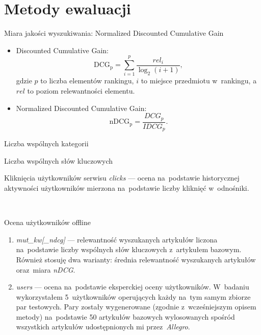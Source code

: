 \documentclass{beamer}
\begin{document}
	\section{Metody ewaluacji}
	\begin{frame}{Miara jakości wyszukiwania: Normalized Discounted Cumulative Gain}
		\begin{itemize}
			\item Discounted Cumulative Gain:
			\begin{equation}
			\label{eq:dcg}
			{\mathrm  {DCG_{{p}}}}=\sum _{{i=1}}^{{p}}{\frac  {rel_{i}}{\log _{{2}}(i+1)}},
			\end{equation}
			gdzie $p$ to liczba elementów rankingu, $i$ to miejsce przedmiotu w~rankingu, a $rel$ to poziom relewantności elementu.
			
			\pause
			\item Normalized Discounted Cumulative Gain:
			\begin{equation}
			\label{eq:ndcg}
			{\mathrm  {nDCG_{{p}}}}={\frac  {DCG_{{p}}}{IDCG_{{p}}}}.
			\end{equation}
		\end{itemize}
	\end{frame}
	\begin{frame}{Liczba wspólnych kategorii}
	\end{frame}
	\begin{frame}{Liczba wspólnych słów kluczowych}
	\end{frame}
	\begin{frame}{Kliknięcia użytkowników serwisu}
		\textit{clicks} --- ocena na~podstawie historycznej aktywności użytkowników mierzona na~podstawie liczby kliknięć w~odnośniki.
	\end{frame}
	\
	\begin{frame}{Ocena użytkowników offline}
		\begin{enumerate}
			\item \textit{mut\_kw[\_ndcg]} --- relewantność wyszukanych artykułów liczona na~podstawie liczby wspólnych słów kluczowych z~artykułem bazowym. Również stosuję dwa warianty: średnia relewantność wyszukanych artykułów oraz~miara \textit{nDCG}.
			\item \textit{users} --- ocena na~podstawie eksperckiej oceny użytkowników. W~badaniu wykorzystałem 5~użytkowników operujących każdy na~tym samym zbiorze par testowych. Pary zostały wygenerowane (zgodnie z~wcześniejszym opisem metody) na~podstawie 50 artykułów bazowych wylosowanych spośród wszystkich artykułów udostępnionych mi przez~\textit{Allegro}.
		\end{enumerate}
	\end{frame}
\end{document}
